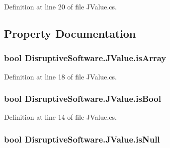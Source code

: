 Definition at line 20 of file J\+Value.\+cs.



\subsection{Property Documentation}
\hypertarget{class_disruptive_software_1_1_j_value_ad3f174641df11f27b5a55af2648514d8}{
\subsubsection[{is\+Array}]{\setlength{\rightskip}{0pt plus 5cm}bool Disruptive\+Software.\+J\+Value.\+is\+Array\hspace{0.3cm}{\ttfamily [get]}}}\label{class_disruptive_software_1_1_j_value_ad3f174641df11f27b5a55af2648514d8}


Definition at line 18 of file J\+Value.\+cs.

\hypertarget{class_disruptive_software_1_1_j_value_a9fc87ea409092d44e0751810c8cc5d56}{
\subsubsection[{is\+Bool}]{\setlength{\rightskip}{0pt plus 5cm}bool Disruptive\+Software.\+J\+Value.\+is\+Bool\hspace{0.3cm}{\ttfamily [get]}}}\label{class_disruptive_software_1_1_j_value_a9fc87ea409092d44e0751810c8cc5d56}


Definition at line 14 of file J\+Value.\+cs.

\hypertarget{class_disruptive_software_1_1_j_value_a0655a428d88bd7447a6a6472765bf9a6}{
\subsubsection[{is\+Null}]{\setlength{\rightskip}{0pt plus 5cm}bool Disruptive\+Software.\+J\+Value.\+is\+Null\hspace{0.3cm}{\ttfamily [get]}}}\label{class_disruptive_software_1_1_j_value_a0655a428d88bd7447a6a6472765bf9a6}


